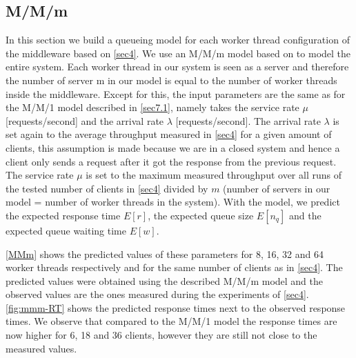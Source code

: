 \documentclass[11pt,a4paper]{article}
\begin{document}
\subsection{M/M/m} \label{sec7.2}
In this section we build a queueing model for each worker thread configuration of the middleware based on \autoref{sec4}. We use an M/M/m model based on  to model the entire system. Each worker thread in our system is seen as a server and therefore the number of server m in our model is equal to the  number of worker threads inside the middleware. Except for this, the input parameters are the same as for the M/M/1 model described in \autoref{sec7.1}, namely takes the service rate $\mu$ [requests/second] and the arrival rate $\lambda$ [requests/second]. The arrival rate $\lambda$ is set again to the average throughput measured in \autoref{sec4} for a given amount of clients, this assumption is made because we are in a closed system and hence a client only sends a request after it got the response from the previous request. The service rate $\mu$ is set to the maximum measured throughput over all runs of the tested number of clients in \autoref{sec4} divided by $m$ (number of servers in our model = number of worker threads in the system). 
With the model, we predict the expected response time $E[r]$, the expected queue size $E[n_q]$ and the expected queue waiting time $E[w]$.

\autoref{MMm} shows the predicted values of these parameters for 8, 16, 32 and 64 worker threads respectively and for the same number of clients as in \autoref{sec4}. The predicted values were obtained using the described M/M/m model and the observed values are the ones measured during the experiments of \autoref{sec4}.
\autoref{fig:mmm-RT} shows the predicted response times next to the observed response times. We observe that compared to the M/M/1 model the response times are now higher for 6, 18 and 36 clients, however they are still not close to the measured values. 
\end{document}
